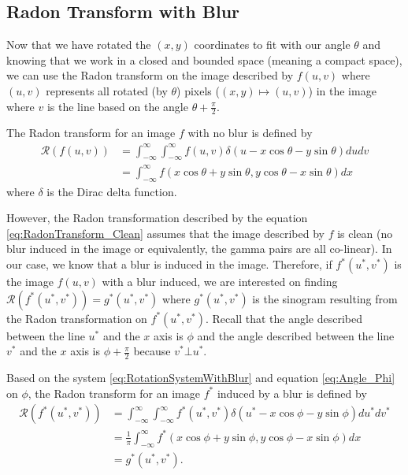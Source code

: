 \documentclass{article}
\begin{document}
\subsection{Radon Transform with Blur}
Now that we have rotated the $(x, y)$ coordinates to fit with our angle $\theta$ and knowing that we work in a closed and bounded space (meaning a compact space), we can use the Radon transform on the image described by $f(u, v)$ where $(u, v)$ represents all rotated (by $\theta$) pixels ($(x, y) \mapsto (u, v)$) in the image where $v$ is the line based on the angle $\theta + \frac{\pi}{2}$.

The Radon transform for an image $f$ with no blur is defined by
\begin{equation} \label{eq:RadonTransform_Clean}
\begin{aligned}
	\mathcal{R}(f(u, v)) &= \int_{-\infty}^{\infty} \int_{-\infty}^{\infty} f(u, v) \delta(u - x \cos \theta - y \sin \theta) du dv \\
						 &= \int_{-\infty}^{\infty} f(x \cos \theta + y \sin \theta, y \cos \theta - x \sin \theta) dx
\end{aligned}
\end{equation}
where $\delta$ is the Dirac delta function.

However, the Radon transformation described by the equation \eqref{eq:RadonTransform_Clean} assumes that the image described by $f$ is clean (no blur induced in the image or equivalently, the gamma pairs are all co-linear). In our case, we know that a blur is induced in the image. Therefore, if $f^*(u^*, v^*)$ is the image $f(u, v)$ with a blur induced, we are interested on finding $\mathcal{R}(f^*(u^*, v^*)) = g^*(u^*, v^*)$ where $g^*(u^*, v^*)$ is the sinogram resulting from the Radon transformation on $f^*(u^*, v^*)$. Recall that the angle described between the line $u^*$ and the $x$ axis is $\phi$ and the angle described between the line $v^*$ and the $x$ axis is $\phi + \frac{\pi}{2}$ because $v^* \bot u^*$.

Based on the system \eqref{eq:RotationSystemWithBlur} and equation \eqref{eq:Angle_Phi} on $\phi$, the Radon transform for an image $f^*$ induced by a blur is defined by
\begin{equation} \label{eq:RadonTransform_Blur}
\begin{aligned}
	\mathcal{R}(f^*(u^*, v^*)) &= \int_{-\infty}^{\infty} \int_{-\infty}^{\infty} f^*(u^*, v^*) \delta(u^* - x \cos \phi - y \sin \phi) du^* dv^* \\
						 &= \frac{1}{\pi} \int_{-\infty}^{\infty} f^*(x \cos \phi + y \sin \phi, y \cos \phi - x \sin \phi) dx \\
						 &= g^*(u^*, v^*).
\end{aligned}
\end{equation}
\end{document}
